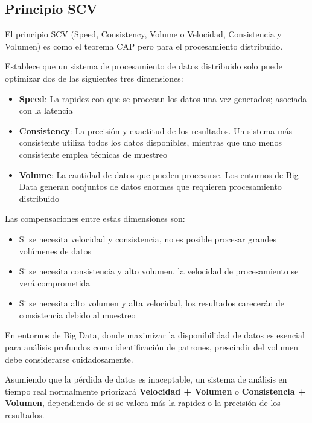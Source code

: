\newpage

\subsection{Principio SCV}

El principio SCV (Speed, Consistency, Volume o Velocidad, Consistencia y Volumen) es como el teorema CAP pero para el procesamiento distribuido. 

Establece que un sistema de procesamiento de datos distribuido solo puede optimizar dos de las siguientes tres dimensiones:

\begin{itemize}
    \item \textbf{Speed}: La rapidez con que se procesan los datos una vez generados; asociada con la latencia
    \item \textbf{Consistency}: La precisión y exactitud de los resultados. Un sistema más consistente utiliza todos los datos disponibles, mientras que uno menos consistente emplea técnicas de muestreo
    \item \textbf{Volume}: La cantidad de datos que pueden procesarse. Los entornos de Big Data generan conjuntos de datos enormes que requieren procesamiento distribuido
\end{itemize}

Las compensaciones entre estas dimensiones son:

\begin{itemize}
    \item Si se necesita velocidad y consistencia, no es posible procesar grandes volúmenes de datos
    \item Si se necesita consistencia y alto volumen, la velocidad de procesamiento se verá comprometida
    \item Si se necesita alto volumen y alta velocidad, los resultados carecerán de consistencia debido al muestreo
\end{itemize}

En entornos de Big Data, donde maximizar la disponibilidad de datos es esencial para análisis profundos como identificación de patrones, 
prescindir del volumen debe considerarse cuidadosamente. \newline

Asumiendo que la pérdida de datos es inaceptable, un sistema de análisis en tiempo real normalmente priorizará \textbf{Velocidad + Volumen} o \textbf{Consistencia + Volumen}, 
dependiendo de si se valora más la rapidez o la precisión de los resultados. \parencite{scv}

